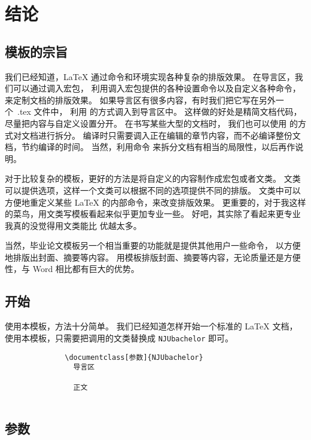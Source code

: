 \chapter{结论}
\section{模板的宗旨}

我们已经知道，\LaTeX{} 通过命令和环境实现各种复杂的排版效果。
在导言区，我们可以通过调入宏包，
利用调入宏包提供的各种设置命令以及自定义各种命令，
来定制文档的排版效果。
如果导言区有很多内容，有时我们把它写在另外一个~.tex 文件中，
利用 \verb|| 的方式调入到导言区中。
这样做的好处是精简文档代码，尽量把内容与自定义设置分开。
在书写某些大型的文档时，
我们也可以使用 \verb|| 的方式对文档进行拆分。
编译时只需要调入正在编辑的章节内容，而不必编译整份文档，节约编译的时间。
当然，利用命令 \verb|| 来拆分文档有相当的局限性，以后再作说明。

对于比较复杂的模板，更好的方法是将自定义的内容制作成宏包或者文类。
文类可以提供选项，这样一个文类可以根据不同的选项提供不同的排版。
文类中可以方便地重定义某些 \LaTeX{} 的内部命令，来改变排版效果。
更重要的，对于我这样的菜鸟，用文类写模板看起来似乎更加专业一些。
好吧，其实除了看起来更专业我真的没觉得用文类能比 \verb|| 优越太多。

当然，毕业论文模板另一个相当重要的功能就是提供其他用户一些命令，
以方便地排版出封面、摘要等内容。
用模板排版封面、摘要等内容，无论质量还是方便性，与 Word 相比都有巨大的优势。

\section{开始}

使用本模板，方法十分简单。
我们已经知道怎样开始一个标准的 \LaTeX{} 文档，
使用本模板，只需要把调用的文类替换成 \verb|NJUbachelor| 即可。

{\small\vspace{-0.2em}%
\begin{verbatim}
              \documentclass[参数]{NJUbachelor}
                导言区
              
                正文
              
\end{verbatim}}


\section{参数}

